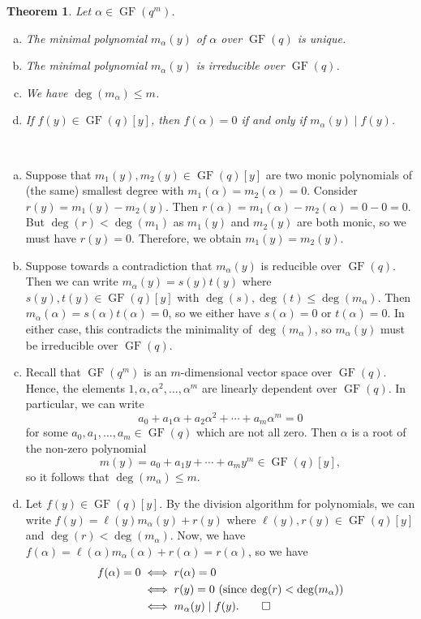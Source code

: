 \documentclass[10pt]{article}
\makeatletter
\DeclareMathOperator{\GF}{GF}
\theoremstyle{newstyle}
\newtheorem{thm}{Theorem}[subsection]
\newenvironment{pf}[1][\proofname]{\par
  \pushQED{\qed}%
  \normalfont \topsep0\p@\relax
  \trivlist
  \item[\hskip\labelsep\scshape
  #1\@addpunct{.}]\ignorespaces
}{%
  \popQED\endtrivlist\@endpefalse
}
\makeatother
\begin{document}
\begin{thm}
Let $\alpha \in \GF(q^m)$. 
\begin{enumerate}[(a)]
    \item The minimal polynomial $m_\alpha(y)$ of $\alpha$ over $\GF(q)$ is unique.
    \item The minimal polynomial $m_\alpha(y)$ is irreducible over $\GF(q)$.
    \item We have $\deg(m_\alpha) \leq m$.
    \item If $f(y) \in \GF(q)[y]$, then $f(\alpha) = 0$ if and only if $m_\alpha(y) \mid f(y)$. 
\end{enumerate}
\end{thm}
\begin{pf}~
\begin{enumerate}[(a)]
    \item Suppose that $m_1(y), m_2(y) \in \GF(q)[y]$ are two monic polynomials of (the same)
    smallest degree with $m_1(\alpha) = m_2(\alpha) = 0$. Consider $r(y) = m_1(y) - m_2(y)$. Then 
    $r(\alpha) = m_1(\alpha) - m_2(\alpha) = 0 - 0 = 0$. But $\deg(r) < \deg(m_1)$ 
    as $m_1(y)$ and $m_2(y)$ are both monic, so we must have $r(y) = 0$. Therefore, 
    we obtain $m_1(y) = m_2(y)$. 
    \item Suppose towards a contradiction that $m_\alpha(y)$ is reducible over $\GF(q)$. 
    Then we can write $m_\alpha(y) = s(y)t(y)$ where $s(y), t(y) \in \GF(q)[y]$ with 
    $\deg(s), \deg(t) \leq \deg(m_\alpha)$. Then $m_\alpha(\alpha) = s(\alpha)t(\alpha) = 0$, 
    so we either have $s(\alpha) = 0$ or $t(\alpha) = 0$. In either case, this contradicts the 
    minimality of $\deg(m_\alpha)$, so $m_\alpha(y)$ must be irreducible over $\GF(q)$. 
    \item Recall that $\GF(q^m)$ is an $m$-dimensional vector space over $\GF(q)$. 
    Hence, the elements $1, \alpha, \alpha^2, \dots, \alpha^m$ are linearly dependent 
    over $\GF(q)$. In particular, we can write 
    \[ a_0 + a_1\alpha + a_2 \alpha^2 + \cdots + a_m \alpha^m = 0 \]
    for some $a_0, a_1, \dots, a_m \in \GF(q)$ which are not all zero. Then $\alpha$ is a 
    root of the non-zero polynomial 
    \[ m(y) = a_0 + a_1 y + \cdots + a_m y^m \in \GF(q)[y], \]
    so it follows that $\deg(m_\alpha) \leq m$. 
    \item Let $f(y) \in \GF(q)[y]$. By the division algorithm for polynomials, we can write 
    $f(y) = \ell(y) m_\alpha(y) + r(y)$ where $\ell(y), r(y) \in \GF(q)[y]$ and 
    $\deg(r) < \deg(m_\alpha)$. Now, we have $f(\alpha) = \ell(\alpha) m_\alpha(\alpha) + r(\alpha) 
    = r(\alpha)$, so we have 
    \begin{align*}
        f(\alpha) = 0 &\iff r(\alpha) = 0 \\
        &\iff r(y) = 0 \text{ (since $\deg(r) < \deg(m_\alpha)$)} \\
        &\iff m_\alpha(y) \mid f(y). \qedhere 
    \end{align*}
\end{enumerate}
\end{pf}
\end{document}
